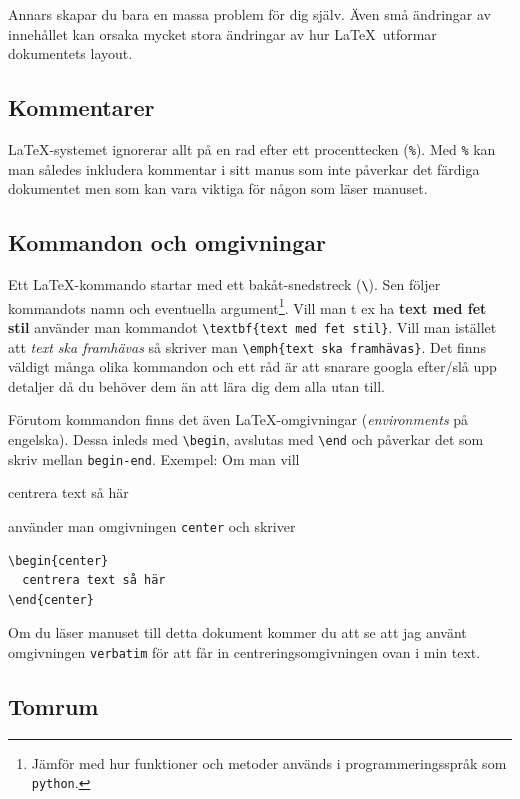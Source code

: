 \documentclass[a4paper,12pt]{article}
\begin{document}
Annars skapar du bara en massa problem för dig själv. Även små
ändringar av innehållet kan orsaka mycket stora ändringar av hur
\LaTeX\ utformar dokumentets layout. 

\subsection{Kommentarer}

\LaTeX-systemet ignorerar allt på en rad efter ett procenttecken
(\verb!%!). Med \verb!%! kan man således inkludera kommentar i sitt
manus som inte påverkar det färdiga dokumentet men som kan vara
viktiga för någon som läser manuset.

\subsection{Kommandon och omgivningar}

Ett \LaTeX-kommando startar med ett bakåt-snedstreck (\verb!\!). Sen
följer kommandots namn och eventuella argument\footnote{Jämför med hur
funktioner och metoder används i programmeringsspråk som
\texttt{python}.}. Vill man t ex ha \textbf{text med fet stil}
använder man kommandot \label{sec:textbf}
\verb!\textbf{text med fet stil}!. Vill man istället att \emph{text 
ska framhävas} så skriver man \verb!\emph{text ska framhävas}!.
\label{sec:emph} Det finns väldigt många olika kommandon 
och ett råd är att snarare googla efter/slå upp detaljer då du behöver
dem än att lära dig dem alla utan till.  

Förutom kommandon finns det även \LaTeX-omgivningar
(\textit{environments} på engelska). Dessa inleds med \verb!\begin!,
  avslutas med \verb!\end! och påverkar det som skriv mellan
\texttt{begin-end}. Exempel: Om man vill 
%
\begin{center}
  centrera text så här
\end{center}
%
använder man omgivningen \texttt{center} och skriver
%
\begin{verbatim}
\begin{center}
  centrera text så här
\end{center}
\end{verbatim}
%
Om du läser manuset till detta dokument kommer du att se att jag
använt omgivningen \texttt{verbatim} för att får in
centreringsomgivningen ovan i min text.  

\subsection{Tomrum}
\end{document}
